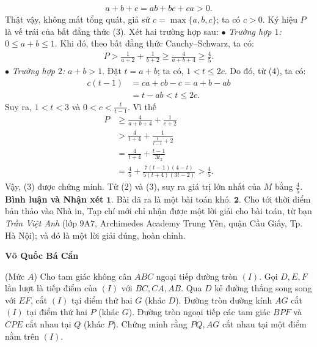 \begin{multicols}{2}
	\begin{align*}
		a + b + c = ab + bc + ca > 0. \tag{$4$}
	\end{align*}
	Thật vậy, không mất tổng quát, giả sử \linebreak$c = \max\{a,b,c\}$;  ta có $c > 0$.
	\vskip 0.05cm
	Ký hiệu $P$ là vế trái của bất đẳng thức ($3$).
	\vskip 0.05cm
	Xét hai trường hợp sau:
	\vskip 0.05cm
	$\bullet$ \textit{Trường hợp $1$:} $0 \le a + b \le 1$.
	\vskip 0.05cm
	Khi đó, theo bất đẳng thức Cauchy--Schwarz, ta có:
	\begin{align*}
		P > \frac{1}{{a + 2}} + \frac{1}{{b + 2}} \ge \frac{4}{{a + b + 4}} \ge \frac{4}{5}.
	\end{align*}
	$\bullet$ \textit{Trường hợp $2$:} $a + b > 1$.
	\vskip 0.05cm
	Đặt $t = a + b$; ta có, $1 < t \le 2c$. Do đó, từ ($4$), ta có:
	\begin{align*}
		c(t - 1) &= ca + cb - c = a + b - ab \\
		&= t - ab < t \le 2c.
	\end{align*}
	Suy ra, $1 < t < 3$ và $0 < c < \frac{t}{t-1}$.  
	Vì thế
	\begin{align*}
		P &\ge \frac{4}{a + b + 4} + \frac{1}{c + 2}\\
		 &> \frac{4}{t + 4} + \frac{1}{\frac{t}{t-1} + 2}\\
		 &= \frac{4}{t + 4} + \frac{t-1}{3t_2}\\
		 &= \frac{4}{5} + \frac{7(t-1)(4-t)}{5(t+4)(3t-2)}>\frac{4}{5}.
	\end{align*}
	Vậy, ($3$) được chứng minh.
	\vskip 0.05cm
	Từ ($2$) và ($3$), suy ra giá trị lớn nhất của $M$ bằng $\frac{4}{5}$.
	\vskip 0.05cm 
	\textbf{\color{thachthuctoanhoc}Bình luận và Nhận xét}
	\vskip 0.05cm
	$\pmb{1.}$ Bài đã ra là một bài toán khó.
	\vskip 0.05cm
	$\pmb{2.}$ Cho tới thời điểm bản thảo vào Nhà in, Tạp chí mới chỉ nhận được một lời giải cho bài toán, từ bạn \textit{Trần Việt Anh} (lớp $9$A$7$, Archimedes Academy Trung Yên, quận Cầu Giấy, Tp. Hà Nội); và đó là một lời giải đúng, hoàn chỉnh.
	\begin{flushright}
		\textbf{\color{thachthuctoanhoc}Võ Quốc Bá Cẩn}
	\end{flushright}
	{}
	(Mức $A$) Cho tam giác không cân $ABC$ ngoại tiếp đường tròn $(I)$. Gọi $D,E,F$ lần lượt là tiếp điểm của $(I)$ với $BC,CA,AB$. Qua $D$ kẻ đường thẳng song song với $EF$, cắt $(I)$ tại điểm thứ hai $G$ (khác $D$). Đường tròn đường kính $AG$ cắt $(I)$ tại điểm thứ hai $P$ (khác $G$). Đường tròn ngoại tiếp các tam giác $BPF$ và $CPE$ cắt nhau tại $Q$ (khác $P$). Chứng minh rằng $PQ,AG$ cắt nhau tại một điểm nằm trên $(I)$. 

\end{multicols}
